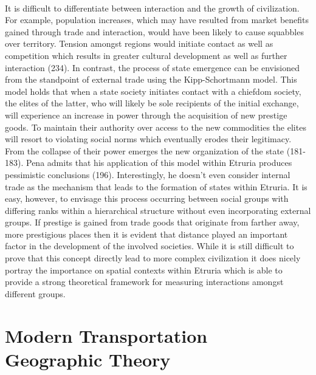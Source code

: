 \documentclass[12pt,a4paper]{thesis}
\begin{document}
\paragraph{}
It is difficult to differentiate between interaction and the growth of civilization. For example, population increases, which may have resulted from market benefits gained through trade and interaction, would have been likely to cause squabbles over territory. Tension amongst regions would initiate contact as well as competition which results in greater cultural development as well as further interaction (234). In contrast, the process of state emergence can be envisioned from the standpoint of external trade \citep{Pen11} using the Kipp-Schortmann model. This model holds that when a state society initiates contact with a chiefdom society, the elites of the latter, who will likely be sole recipients of the initial exchange, will experience an increase in power through the acquisition of new prestige goods. To maintain their authority over access to the new commodities the elites will resort to violating social norms which eventually erodes their legitimacy.  From the collapse of their power emerges the new organization of the state (181-183). Pena admits that his application of this model within Etruria produces pessimistic conclusions (196). Interestingly, he doesn't even consider internal trade as the mechanism that leads to the formation of states within Etruria. It is easy, however, to envisage this process occurring between social groups with differing ranks within a hierarchical structure without even incorporating external groups. If prestige is gained from trade goods that originate from farther away, more prestigious places then it is evident that distance played an important factor in the development of the involved societies. While it is still difficult to prove that this concept directly lead to more complex civilization it does nicely portray the importance on spatial contexts within Etruria which is able to provide a strong theoretical framework for measuring interactions amongst different groups. 

\section{Modern Transportation Geographic Theory}
\end{document}
